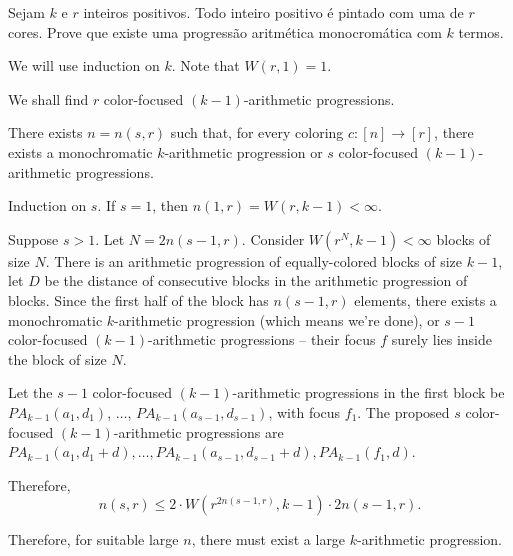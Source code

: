 \documentclass[10pt,a4paper]{article}
\DeclareMathOperator\ex{ex}
\begin{document}
\begin{prob}
	Sejam $k$ e $r$ inteiros positivos. Todo inteiro positivo é pintado com uma de $r$ cores. Prove que existe uma progressão aritmética monocromática com $k$ termos.
\end{prob}

\begin{sol}
	We will use induction on $k$. Note that $W(r, 1) = 1$.

	We shall find $r$ color-focused $(k-1)$-arithmetic progressions.
	\begin{lem}
		There exists $n = n(s, r)$ such that, for every coloring $c\colon [n] \to [r]$, there exists a monochromatic $k$-arithmetic progression or $s$ color-focused $(k-1)$-arithmetic progressions.
	\end{lem}
	\begin{dem}
		Induction on $s$. If $s = 1$, then $n(1, r) = W(r, k-1) < \infty$.

		Suppose $s > 1$. Let $N = 2n(s-1, r)$. Consider $W(r^N, k-1) < \infty$ blocks of size $N$. There is an arithmetic progression of equally-colored blocks of size $k-1$, let $D$ be the distance of consecutive blocks in the arithmetic progression of blocks. Since the first half of the block has $n(s-1, r)$ elements, there exists a monochromatic $k$-arithmetic progression (which means we're done), or $s-1$ color-focused $(k-1)$-arithmetic progressions -- their focus $f$ surely lies inside the block of size $N$.

		Let the $s-1$ color-focused $(k-1)$-arithmetic progressions in the first block be $PA_{k-1}(a_1, d_1)$, $\dots$, $PA_{k-1}(a_{s-1}, d_{s-1})$, with focus $f_1$. The proposed $s$ color-focused $(k-1)$-arithmetic progressions are $PA_{k-1}(a_1, d_1 + d), \dots, PA_{k-1}(a_{s-1}, d_{s-1} + d), PA_{k-1}(f_1, d)$.

		Therefore,  \[
			n(s, r) \le 2 \cdot W(r^{2n(s-1, r)}, k-1) \cdot 2n(s-1, r).
		\]
	\end{dem}

	Therefore, for suitable large $n$, there must exist a large $k$-arithmetic progression.
\end{sol}





%
\end{document}
